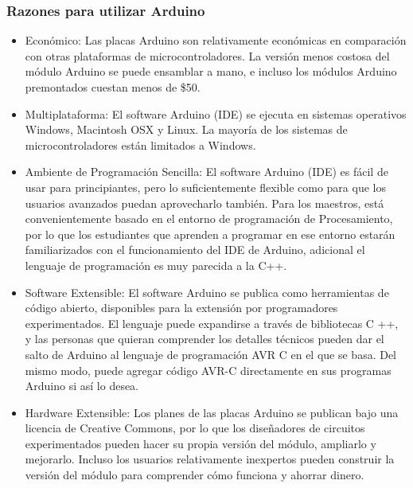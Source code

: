 	\subsubsection{Razones para utilizar Arduino}
		\begin{itemize}
			\item Económico: 
			Las placas Arduino son relativamente económicas en comparación con otras plataformas de microcontroladores. La versión menos costosa del módulo Arduino se puede ensamblar a mano, e incluso los módulos Arduino premontados cuestan menos de \$50.
			
			\item Multiplataforma: El software Arduino (IDE) se ejecuta en sistemas operativos Windows, Macintosh OSX y Linux. La mayoría de los sistemas de microcontroladores están limitados a Windows.
			
			\item Ambiente de Programación Sencilla: El software Arduino (IDE) es fácil de usar para principiantes, pero lo suficientemente flexible como para que los usuarios avanzados puedan aprovecharlo también. Para los maestros, está convenientemente basado en el entorno de programación de Procesamiento, por lo que los estudiantes que aprenden a programar en ese entorno estarán familiarizados con el funcionamiento del IDE de Arduino, adicional el lenguaje de programación es muy parecida a la C++.
			
			\item Software Extensible: El software Arduino se publica como herramientas de código abierto, disponibles para la extensión por programadores experimentados. El lenguaje puede expandirse a través de bibliotecas C ++, y las personas que quieran comprender los detalles técnicos pueden dar el salto de Arduino al lenguaje de programación AVR C en el que se basa. Del mismo modo, puede agregar código AVR-C directamente en sus programas Arduino si así lo desea.
			
			\item Hardware Extensible: 
			Los planes de las placas Arduino se publican bajo una licencia de Creative Commons, por lo que los diseñadores de circuitos experimentados pueden hacer su propia versión del módulo, ampliarlo y mejorarlo. Incluso los usuarios relativamente inexpertos pueden construir la versión del módulo para comprender cómo funciona y ahorrar dinero.
		\end{itemize}